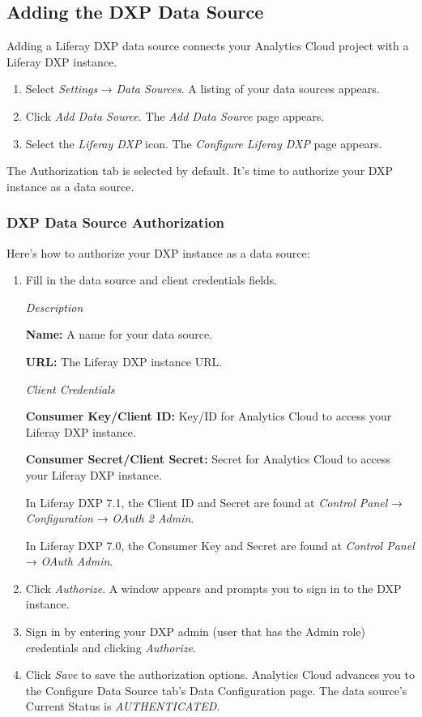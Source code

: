 \noindent\hrulefill

\subsection{Adding the DXP Data
Source}\label{adding-the-dxp-data-source}

Adding a Liferay DXP data source connects your Analytics Cloud project
with a Liferay DXP instance.

\begin{enumerate}
\def\labelenumi{\arabic{enumi}.}
\item
  Select \emph{Settings} → \emph{Data Sources}. A listing of your data
  sources appears.
\item
  Click \emph{Add Data Source}. The \emph{Add Data Source} page appears.
\item
  Select the \emph{Liferay DXP} icon. The \emph{Configure Liferay DXP}
  page appears.
\end{enumerate}

The Authorization tab is selected by default. It's time to authorize
your DXP instance as a data source.

\subsubsection{DXP Data Source
Authorization}\label{dxp-data-source-authorization}

Here's how to authorize your DXP instance as a data source:

\begin{enumerate}
\def\labelenumi{\arabic{enumi}.}
\item
  Fill in the data source and client credentials fields.

  \emph{Description}

  \textbf{Name:} A name for your data source.

  \textbf{URL:} The Liferay DXP instance URL.

  \emph{Client Credentials}

  \textbf{Consumer Key/Client ID:} Key/ID for Analytics Cloud to access
  your Liferay DXP instance.

  \textbf{Consumer Secret/Client Secret:} Secret for Analytics Cloud to
  access your Liferay DXP instance.

  In Liferay DXP 7.1, the Client ID and Secret are found at
  \emph{Control Panel} → \emph{Configuration} → \emph{OAuth 2 Admin}.

  In Liferay DXP 7.0, the Consumer Key and Secret are found at
  \emph{Control Panel} → \emph{OAuth Admin}.
\item
  Click \emph{Authorize}. A window appears and prompts you to sign in to
  the DXP instance.
\item
  Sign in by entering your DXP admin (user that has the Admin role)
  credentials and clicking \emph{Authorize}.
\item
  Click \emph{Save} to save the authorization options. Analytics Cloud
  advances you to the Configure Data Source tab's Data Configuration
  page. The data source's Current Status is \emph{AUTHENTICATED}.
\end{enumerate}

